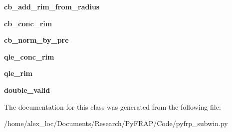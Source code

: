 \begin{DoxyCompactItemize}
\item 
\hypertarget{classpyfrp__subwin_1_1analysis__dialog_a145b7892ff365c8cfb35a1808188a58a}{{\bfseries cb\+\_\+add\+\_\+rim\+\_\+from\+\_\+radius}}\label{classpyfrp__subwin_1_1analysis__dialog_a145b7892ff365c8cfb35a1808188a58a}

\item 
\hypertarget{classpyfrp__subwin_1_1analysis__dialog_a3735740ad0876aff6b12becf5116b9a5}{{\bfseries cb\+\_\+conc\+\_\+rim}}\label{classpyfrp__subwin_1_1analysis__dialog_a3735740ad0876aff6b12becf5116b9a5}

\item 
\hypertarget{classpyfrp__subwin_1_1analysis__dialog_a66ff91635b5c04e31521b752646df6a6}{{\bfseries cb\+\_\+norm\+\_\+by\+\_\+pre}}\label{classpyfrp__subwin_1_1analysis__dialog_a66ff91635b5c04e31521b752646df6a6}

\item 
\hypertarget{classpyfrp__subwin_1_1analysis__dialog_a56404cbad095635ee47ede547eb51f58}{{\bfseries qle\+\_\+conc\+\_\+rim}}\label{classpyfrp__subwin_1_1analysis__dialog_a56404cbad095635ee47ede547eb51f58}

\item 
\hypertarget{classpyfrp__subwin_1_1analysis__dialog_a43e561c53dc8fbda7ef8b2f9d4d3f051}{{\bfseries qle\+\_\+rim}}\label{classpyfrp__subwin_1_1analysis__dialog_a43e561c53dc8fbda7ef8b2f9d4d3f051}

\item 
\hypertarget{classpyfrp__subwin_1_1analysis__dialog_a72fb308fa0f53a11f6067cddfafe41fa}{{\bfseries double\+\_\+valid}}\label{classpyfrp__subwin_1_1analysis__dialog_a72fb308fa0f53a11f6067cddfafe41fa}

\end{DoxyCompactItemize}


The documentation for this class was generated from the following file\+:\begin{DoxyCompactItemize}
\item 
/home/alex\+\_\+loc/\+Documents/\+Research/\+Py\+F\+R\+A\+P/\+Code/pyfrp\+\_\+subwin.\+py\end{DoxyCompactItemize}
